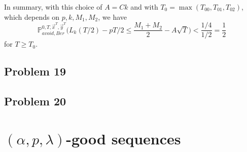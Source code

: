 \documentclass[12pt]{article}
\begin{document}
	In summary, with this choice of $A = Ck$ and with $T_0 = \max(T_{00}, T_{01}, T_{02})$, which depends on $p,k,M_1,M_2$, we have
	\[
	\mathbb{P}^{0,T,\vec{x}^T,\vec{y}^T}_{avoid, Ber} \Big( L_k(T/2) - pT/2 \leq \frac{M_1+M_2}{2} - A\sqrt{T} \Big) < \frac{1/4}{1/2} = \frac{1}{2}
	\]
	for $T\geq T_0$. 
	


\subsection*{Problem 19}


\subsection*{Problem 20}


\section{$(\alpha, p, \lambda)$-good sequences}
	
	
\end{document}
